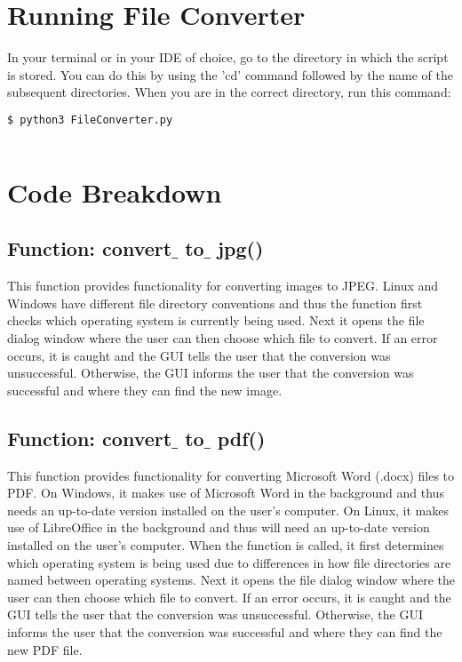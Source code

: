 \documentclass[
	a4paper, %
	12pt, %
]{CSSullivanBusinessReport}
\begin{document}
\begin{fullwidth}
\section{Running File Converter}
In your terminal or in your IDE of choice, go to the directory in which the script is stored. You can do this by using the 'cd' command followed by the name of the subsequent directories. When you are in the correct directory, run this command:

\begin{lstlisting}[language=bash]
	$ python3 FileConverter.py
	
	\end{lstlisting}
	
	\section{Code Breakdown}
	\subsection{Function: convert$\_$ to$\_$ jpg()}
	This function provides functionality for converting images to JPEG. Linux and Windows have different file directory conventions and thus the function first checks which operating system is currently being used. Next it opens the file dialog window where the user can then choose which file to convert. If an error occurs, it is caught and the GUI tells the user that the conversion was unsuccessful. Otherwise, the GUI informs the user that the conversion was successful and where they can find the new image.
	\subsection{Function: convert$\_$ to$\_$ pdf()} 
	This function provides functionality for converting Microsoft Word (.docx) files to PDF. On Windows, it makes use of Microsoft Word in the background and thus needs an up-to-date version installed on the user's computer.  On Linux, it makes use of LibreOffice in the background and thus will need an up-to-date version installed on the user's computer. When the function is called, it first determines which operating system is being used due to differences in how file directories are named between operating systems.  Next it opens the file dialog window where the user can then choose which file to convert. If an error occurs, it is caught and the GUI tells the user that the conversion was unsuccessful. Otherwise, the GUI informs the user that the conversion was successful and where they can find the new PDF file.

\end{fullwidth}
\end{document}
